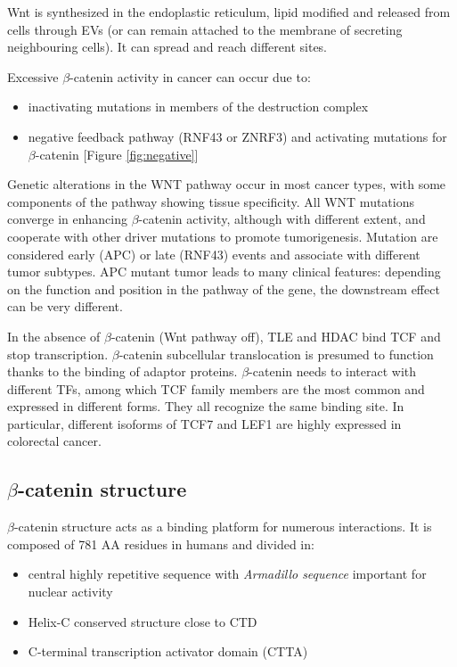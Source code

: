 Wnt is synthesized in the endoplastic reticulum, lipid modified and released from cells through EVs (or can remain attached to the membrane of secreting neighbouring cells). It can spread and reach different sites.

Excessive $\beta$-catenin activity in cancer can occur due to:

\begin{itemize}
\tightlist
\item
  inactivating mutations in members of the destruction complex
\item
  negative feedback pathway (RNF43 or ZNRF3) and activating mutations for $\beta$-catenin [Figure \ref{fig:negative}]
\end{itemize}

Genetic alterations in the WNT pathway occur in most cancer types, with some components of the pathway showing tissue specificity. All WNT mutations converge in enhancing $\beta$-catenin activity, although with different extent, and cooperate with other driver mutations to promote tumorigenesis. Mutation are considered early (APC) or late (RNF43) events and associate with different tumor subtypes. APC mutant tumor leads to many clinical features: depending on the function and position in the pathway of the gene, the downstream effect can be very different.

In the absence of $\beta$-catenin (Wnt pathway off), TLE and HDAC bind TCF and stop transcription. $\beta$-catenin subcellular translocation is presumed to function thanks to the binding of adaptor proteins. $\beta$-catenin needs to interact with different TFs, among which TCF family members are the most common and expressed in different forms. They all recognize the same binding site. In particular, different isoforms of TCF7 and LEF1 are highly expressed in colorectal cancer.

\hypertarget{ux3b2-catenin-structure}{%
\subsection{$\beta$-catenin structure}\label{ux3b2-catenin-structure}}

$\beta$-catenin structure acts as a binding platform for numerous interactions. It is composed of 781 AA residues in humans and divided in:

\begin{itemize}
\tightlist
\item
  central highly repetitive sequence with \emph{Armadillo sequence} important for nuclear activity
\item
  Helix-C conserved structure close to CTD
\item
  C-terminal transcription activator domain (CTTA)
\end{itemize}

